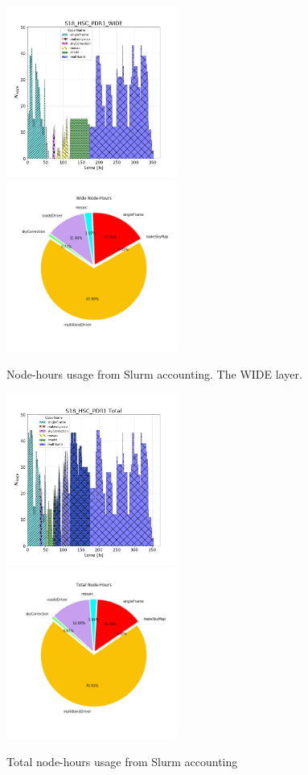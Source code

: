 \begin{figure}[ht]
    \includegraphics[width=0.50\textwidth]{usage-S18_HSC_PDR1_WIDE.png}
    \includegraphics[width=0.50\textwidth]{PDR1_Wide_pie.png}
    \caption{Node-hours usage from Slurm accounting. The WIDE layer.}
    \label{WIDEslurm}
\end{figure}

\begin{figure}[ht]
    \includegraphics[width=0.50\textwidth]{usage-S18_HSC_PDR1_Total.png}
    \includegraphics[width=0.50\textwidth]{PDR1_Total_pie.png}
    \caption{Total node-hours usage from Slurm accounting}
    \label{TOTslurm}
\end{figure}


